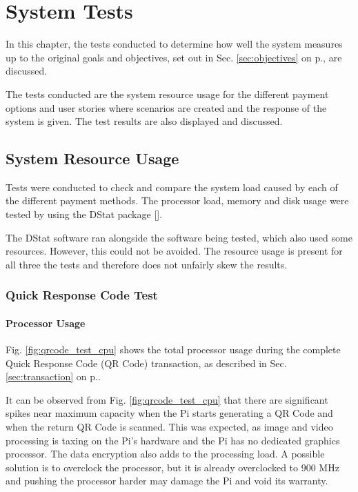 \chapter{System Tests}
\label{chap:6}

In this chapter, the tests  conducted to determine how well the system measures
up to the original goals and objectives, set out in Sec. \ref{sec:objectives} on
p.\pageref{sec:objectives}, are discussed.

The tests conducted are the system resource usage for the different payment
options and user stories where scenarios are created and the response of the
system is given. The test results are also displayed and discussed. 

\section{System Resource Usage}

Tests were conducted to check and compare the system load caused by each of the
different payment methods. The processor load, memory and disk usage were tested
by using the DStat package [\cite{website:dstat}].

The DStat software ran alongside the software being tested, which also used
some resources. However, this could not be avoided. The resource usage is
present for all three the tests and therefore does not unfairly skew the
results.

\subsection{Quick Response Code Test}
\label{sec:qr-tests}

\subsubsection{Processor Usage}

Fig. \ref{fig:qrcode_test_cpu} shows the total processor usage during the complete
Quick Response Code (QR Code) transaction, as described in Sec.
\ref{sec:transaction} on p.\pageref{sec:transaction}.

It can be observed from Fig. \ref{fig:qrcode_test_cpu} that there are
significant spikes near maximum capacity when the Pi starts generating a QR
Code and when the return QR Code is scanned. This was expected, as image and
video processing is taxing on the Pi's hardware and the Pi has no dedicated
graphics processor. The data encryption also adds to the processing load. A possible
solution is to overclock the processor, but it is already overclocked to 900
MHz and pushing the processor harder may damage the Pi and void its warranty.

